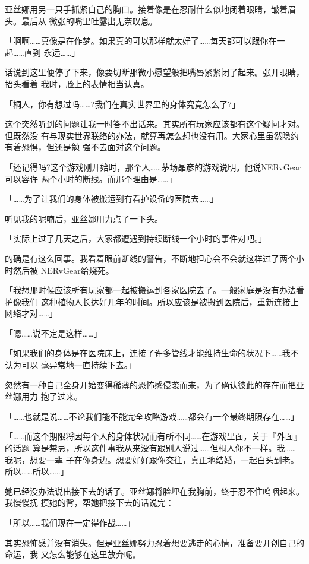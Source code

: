 \documentclass[11pt]{book}
\begin{document}
亚丝娜用另一只手抓紧自己的胸口。接着像是在忍耐什么似地闭着眼睛，皱着眉头。最后从
微张的嘴里吐露出无奈叹息。

「啊啊……真像是在作梦。如果真的可以那样就太好了……每天都可以跟你在一起……直到
永远……」

话说到这里便停了下来，像要切断那微小愿望般把嘴唇紧紧闭了起来。张开眼睛，抬头看着
我时，脸上的表情相当认真。

「桐人，你有想过吗……?我们在真实世界里的身体究竟怎么了?」

这个突然听到的问题让我一时答不出话来。其实所有玩家应该都有这个疑问才对。但既然没
有与现实世界联络的办法，就算再怎么想也没有用。大家心里虽然隐约有着恐惧，但还是勉
强不去面对这个问题。

「还记得吗?这个游戏刚开始时，那个人……茅场晶彦的游戏说明。他说NERvGear可以容许
两个小时的断线。而那个理由是……」

「……为了让我们的身体被搬运到有看护设备的医院去……」

听见我的呢喃后，亚丝娜用力点了一下头。

「实际上过了几天之后，大家都遭遇到持续断线一个小时的事件对吧。」

的确是有这么回事。我看着眼前断线的警告，不断地担心会不会就这样过了两个小时然后被
NERvGear给烧死。

「我想那时候应该所有玩家都一起被搬运到各家医院去了。一般家庭是没有办法看护像我们
这种植物人长达好几年的时间。所以应该是被搬到医院后，重新连接上网络才对……」

「嗯……说不定是这样……」

「如果我们的身体是在医院床上，连接了许多管线才能维持生命的状况下……我不认为可以
毫异常地一直持续下去。」

忽然有一种自己全身开始变得稀薄的恐怖感侵袭而来，为了确认彼此的存在而把亚丝娜用力
抱了过来。

「……也就是说……不论我们能不能完全攻略游戏……都会有一个最终期限存在……」

「……而这个期限将因每个人的身体状况而有所不同……在游戏里面，关于『外面』的话题
算是禁忌，所以这件事我从来没有跟别人说过……但桐人你不一样。我……我呢，想要一辈
子在你身边。想要好好跟你交往，真正地结婚，一起白头到老。所以……所以……」

她已经没办法说出接下去的话了。亚丝娜将脸埋在我胸前，终于忍不住呜咽起来。我慢慢抚
摸她的背，帮她把接下去的话说完：

「所以……我们现在一定得作战……」

其实恐怖感并没有消失。但是亚丝娜努力忍着想要逃走的心情，准备要开创自己的命运，我
又怎么能够在这里放弃呢。
\end{document}
